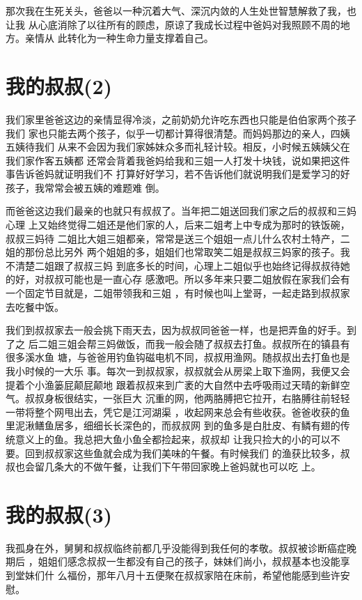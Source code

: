 \documentclass[12pt]{book}
\begin{document}
那次我在生死关头，爸爸以一种沉着大气、深沉内敛的人生处世智慧解救了我，也让我
从心底消除了以往所有的顾虑，原谅了我成长过程中爸妈对我照顾不周的地方。亲情从
此转化为一种生命力量支撑着自己。
\section{我的叔叔(2)}
\label{sec-9-38}

我们家里爸爸这边的亲情显得冷淡，之前奶奶允许吃东西也只能是伯伯家两个孩子我们
家也只能去两个孩子，似乎一切都计算得很清楚。而妈妈那边的亲人，四姨五姨待我们
从来不会因为我们家姊妹众多而礼轻计较。相反，小时候五姨姨父在我们家作客五姨都
还常会背着我爸妈给我和三姐一人打发十块钱，说如果把这件事告诉爸妈就证明我们不
打算好好学习，若不告诉他们就说明我们是爱学习的好孩子，我常常会被五姨的难题难
倒。

而爸爸这边我们最亲的也就只有叔叔了。当年把二姐送回我们家之后的叔叔和三妈心理
上又始终觉得二姐还是他们家的人，后来二姐考上中专成为那时的铁饭碗，叔叔三妈待
二姐比大姐三姐都亲，常常是送三个姐姐一点儿什么农村土特产，二姐的那份总比另外
两个姐姐的多，姐姐们也常取笑二姐是叔叔三妈家的孩子。我不清楚二姐跟了叔叔三妈
到底多长的时间，心理上二姐似乎也始终记得叔叔待她的好，对叔叔可能也是一直心存
感激吧。所以多年来只要二姐放假在家我们会有一个固定节目就是，二姐带领我和三姐
，有时候也叫上堂哥，一起走路到叔叔家去吃餐中饭。

我们到叔叔家去一般会挑下雨天去，因为叔叔同爸爸一样，也是把弄鱼的好手。到了之
后二姐三姐会帮三妈做饭，而我一般会随了叔叔去打鱼。叔叔所在的镇县有很多溪水鱼
塘，与爸爸用钓鱼钩磁电机不同，叔叔用渔网。随叔叔出去打鱼也是我小时候的一大乐
事。每次一到叔叔家，叔叔就会从房梁上取下渔网，我便又会提着个小渔篓屁颠屁颠地
跟着叔叔来到广袤的大自然中去呼吸雨过天晴的新鲜空气。叔叔身板很结实，一张巨大
沉重的网，他两胳膊把它拉开，右胳膊往前轻轻一带将整个网甩出去，凭它是江河湖渠
，收起网来总会有些收获。爸爸收获的鱼里泥湫鳝鱼居多，细细长长深色的，而叔叔网
到的鱼多是白肚皮、有鳞有翅的传统意义上的鱼。我总把大鱼小鱼全都捡起来，叔叔却
让我只捡大的小的可以不要。回到叔叔家这些鱼就会成为我们美味的午餐。有时候我们
的渔获比较多，叔叔也会留几条大的不做午餐，让我们下午带回家晚上爸妈就也可以吃
上。
\section{我的叔叔(3)}
\label{sec-9-39}

我孤身在外，舅舅和叔叔临终前都几乎没能得到我任何的孝敬。叔叔被诊断癌症晚期后
，姐姐们感念叔叔一生都没有自己的孩子，妹妹们尚小，叔叔基本也没能享到堂妹们什
么福份，那年八月十五便聚在叔叔家陪在床前，希望他能感到些许安慰。
\end{document}
